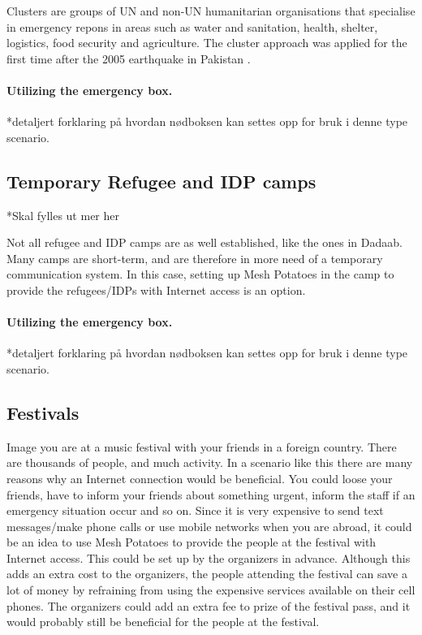 Clusters are groups of UN and non-UN humanitarian organisations that specialise in emergency repons in areas such as water and sanitation, health, shelter, logistics, food security and agriculture. The cluster approach was applied for the first time after the 2005 earthquake in Pakistan \cite{disasterResponse}.


\paragraph{Utilizing the emergency box.}
*detaljert forklaring på hvordan nødboksen kan settes opp for bruk i denne type scenario. 

\subsection{Temporary Refugee and IDP camps}

*Skal fylles ut mer her

Not all refugee and IDP camps are as well established, like the ones in Dadaab. Many camps are short-term, and are therefore in more need of a temporary communication system. In this case, setting up Mesh Potatoes in the camp to provide the refugees/IDPs with Internet access is an option. 

\paragraph{Utilizing the emergency box.}
*detaljert forklaring på hvordan nødboksen kan settes opp for bruk i denne type scenario. 

\subsection{Festivals}
Image you are at a music festival with your friends in a foreign country. There are thousands of people, and much activity. In a scenario like this there are many reasons why an Internet connection would be beneficial. You could loose your friends, have to inform your friends about something urgent, inform the staff if an emergency situation occur and so on. Since it is very expensive to send text messages/make phone calls or use mobile networks when you are abroad, it could be an idea to use Mesh Potatoes to provide the people at the festival with Internet access. This could be set up by the organizers in advance. Although this adds an extra cost to the organizers, the people attending the festival can save a lot of money by refraining from using the expensive services available on their cell phones. The organizers could add an extra fee to prize of the festival pass, and it would probably still be beneficial for the people at the festival. 


